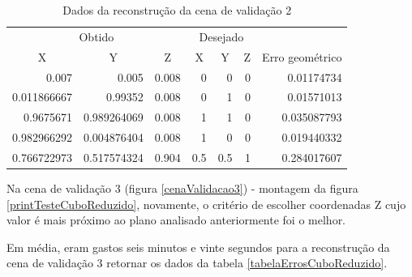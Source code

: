 		\begin{table}
			\caption{Dados da reconstrução da cena de validação 2}
			\label{tabelaErrosPiramide}
			\begin{center}
				\begin{tabular}{r r r | r r r | r}
					\hline
					\multicolumn{3}{c}{Obtido} & \multicolumn{3}{c}{Desejado}\\
					\cline{1-6}
					\multicolumn{1}{c}{X} & \multicolumn{1}{c}{Y} & \multicolumn{1}{c}{Z} & \multicolumn{1}{c}{X} & \multicolumn{1}{c}{Y} & \multicolumn{1}{c}{Z} & \multicolumn{1}{c}{Erro geométrico}\\
					\hline			
					0.007					&			0.005					&		0.008		&		0			&		0			&		0		&		0.01174734\\
					0.011866667		&			0.99352				&		0.008		&		0			&		1			&		0		&		0.01571013\\
					0.9675671			&			0.989264069		&		0.008		&		1			&		1			&		0		&		0.035087793\\
					0.982966292		& 		0.004876404		&		0.008		&		1			&		0			&		0		&		0.019440332\\
					0.766722973		&			0.517574324		&		0.904		&		0.5		&		0.5		&		1		&		0.284017607\\
					\hline
				\end{tabular}
			\end{center}
		\end{table}
		
		Na cena de validação 3 (figura \ref{cenaValidacao3}) - montagem da figura \ref{printTesteCuboReduzido}, novamente, o critério de escolher coordenadas Z cujo valor é mais próximo ao plano analisado anteriormente foi o melhor.
		
		Em média, eram gastos seis minutos e vinte segundos para a reconstrução da cena de validação 3 retornar os dados da tabela \ref{tabelaErrosCuboReduzido}.
		
